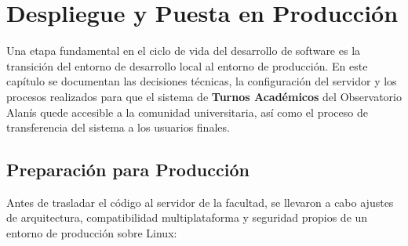 \chapter{Despliegue y Puesta en Producción}
\label{cap:despliegue}

Una etapa fundamental en el ciclo de vida del desarrollo de software es la transición del entorno de desarrollo local al entorno de producción. En este capítulo se documentan las decisiones técnicas, la configuración del servidor y los procesos realizados para que el sistema de \textbf{Turnos Académicos} del Observatorio Alanís quede accesible a la comunidad universitaria, así como el proceso de transferencia del sistema a los usuarios finales.

\section{Preparación para Producción}

Antes de trasladar el código al servidor de la facultad, se llevaron a cabo ajustes de arquitectura, compatibilidad multiplataforma y seguridad propios de un entorno de producción sobre Linux:

